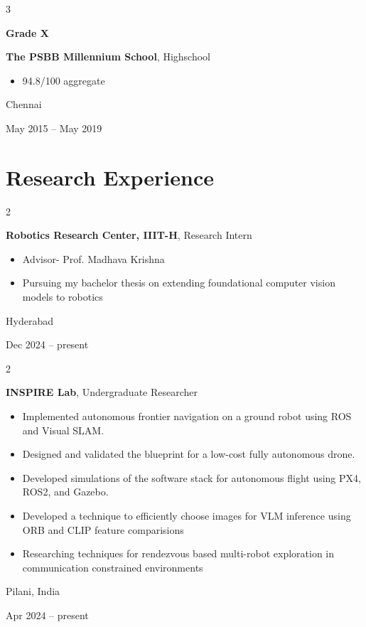 \documentclass[10pt, a4paper]{article}
\newenvironment{highlights}{
    \begin{itemize}[
        topsep=0.10 cm,
        parsep=0.10 cm,
        partopsep=0pt,
        itemsep=0pt,
        leftmargin=0.4 cm + 10pt
    ]
}{
    \end{itemize}
} %
\newenvironment{twocolentry}[2][]{
    \onecolentry
    \def\secondColumn{#2}
    \setcolumnwidth{\fill, 4 cm}
    \begin{paracol}{2}
}{
    \switchcolumn \raggedleft \secondColumn
    \end{paracol}
    \endonecolentry
} %
\newenvironment{threecolentry}[3][]{
    \onecolentry
    \def\thirdColumn{#3}
    \setcolumnwidth{1.5 cm, \fill, 4 cm}
    \begin{paracol}{3}
    {\raggedright #2} \switchcolumn
}{
    \switchcolumn \raggedleft \thirdColumn
    \end{paracol}
    \endonecolentry
} %
\begin{document}
        \vspace{0.2 cm}

        \begin{threecolentry}{\textbf{Grade X}}{
            Chennai

        May 2015 – May 2019
        }
            \textbf{The PSBB Millennium School}, Highschool
            \begin{highlights}
                \item 94.8/100 aggregate
            \end{highlights}
        \end{threecolentry}


    
    \section{Research Experience}



        
        \begin{twocolentry}{
            Hyderabad

        Dec 2024 – present
        }
            \textbf{Robotics Research Center, IIIT-H}, Research Intern
            \begin{highlights}
                \item Advisor- Prof. Madhava Krishna
                \item Pursuing my bachelor thesis on extending foundational computer vision models to robotics
            \end{highlights}
        \end{twocolentry}


        \vspace{0.2 cm}

        \begin{twocolentry}{
            Pilani, India

        Apr 2024 – present
        }
            \textbf{INSPIRE Lab}, Undergraduate Researcher
            \begin{highlights}
                \item Implemented autonomous frontier navigation on a ground robot using ROS and Visual SLAM.
                \item Designed and validated the blueprint for a low-cost fully autonomous drone.
                \item Developed simulations of the software stack for autonomous flight using PX4, ROS2, and Gazebo.
                \item Developed a technique to efficiently choose images for VLM inference using ORB and CLIP feature comparisions
                \item Researching techniques for rendezvous based multi-robot exploration in communication constrained environments
            \end{highlights}
        \end{twocolentry}
\end{document}
